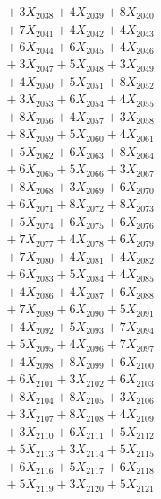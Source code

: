 \documentclass[a4paper,10pt]{article}
\begin{document}
{\begin{align}
&\;  + 3 X_{2038} + 4 X_{2039} + 8 X_{2040} \\[0.3ex]
&\;  + 7 X_{2041} + 4 X_{2042} + 4 X_{2043} \\[0.3ex]
&\;  + 6 X_{2044} + 6 X_{2045} + 4 X_{2046} \\[0.3ex]
&\;  + 3 X_{2047} + 5 X_{2048} + 3 X_{2049} \\[0.5ex]\allowbreak
&\;  + 4 X_{2050} + 5 X_{2051} + 8 X_{2052} \\[0.3ex]
&\;  + 3 X_{2053} + 6 X_{2054} + 4 X_{2055} \\[0.3ex]
&\;  + 8 X_{2056} + 4 X_{2057} + 3 X_{2058} \\[0.3ex]
&\;  + 8 X_{2059} + 5 X_{2060} + 4 X_{2061} \\[0.3ex]
&\;  + 5 X_{2062} + 6 X_{2063} + 8 X_{2064} \\[0.3ex]
&\;  + 6 X_{2065} + 5 X_{2066} + 3 X_{2067} \\[0.3ex]
&\;  + 8 X_{2068} + 3 X_{2069} + 6 X_{2070} \\[0.3ex]
&\;  + 6 X_{2071} + 8 X_{2072} + 8 X_{2073} \\[0.3ex]
&\;  + 5 X_{2074} + 6 X_{2075} + 6 X_{2076} \\[0.3ex]
&\;  + 7 X_{2077} + 4 X_{2078} + 6 X_{2079} \\[0.5ex]\allowbreak
&\;  + 7 X_{2080} + 4 X_{2081} + 4 X_{2082} \\[0.3ex]
&\;  + 6 X_{2083} + 5 X_{2084} + 4 X_{2085} \\[0.3ex]
&\;  + 4 X_{2086} + 4 X_{2087} + 6 X_{2088} \\[0.3ex]
&\;  + 7 X_{2089} + 6 X_{2090} + 5 X_{2091} \\[0.3ex]
&\;  + 4 X_{2092} + 5 X_{2093} + 7 X_{2094} \\[0.3ex]
&\;  + 5 X_{2095} + 4 X_{2096} + 7 X_{2097} \\[0.3ex]
&\;  + 4 X_{2098} + 8 X_{2099} + 6 X_{2100} \\[0.3ex]
&\;  + 6 X_{2101} + 3 X_{2102} + 6 X_{2103} \\[0.3ex]
&\;  + 8 X_{2104} + 8 X_{2105} + 3 X_{2106} \\[0.3ex]
&\;  + 3 X_{2107} + 8 X_{2108} + 4 X_{2109} \\[0.5ex]\allowbreak
&\;  + 3 X_{2110} + 6 X_{2111} + 5 X_{2112} \\[0.3ex]
&\;  + 5 X_{2113} + 3 X_{2114} + 5 X_{2115} \\[0.3ex]
&\;  + 6 X_{2116} + 5 X_{2117} + 6 X_{2118} \\[0.3ex]
&\;  + 5 X_{2119} + 3 X_{2120} + 5 X_{2121} \\[0.3ex]

\end{align}}
\end{document}
